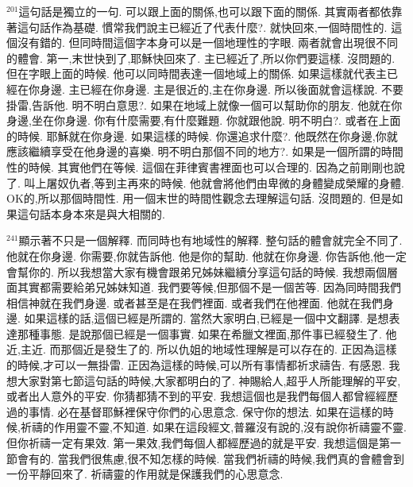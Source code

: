 \documentclass{book}
\begin{document}
$^{201}$這句話是獨立的一句.
可以跟上面的關係,也可以跟下面的關係.
其實兩者都依靠著這句話作為基礎.
慣常我們說主已經近了代表什麼?.
就快回來,一個時間性的.
這個沒有錯的.
但同時間這個字本身可以是一個地理性的字眼.
兩者就會出現很不同的體會.
第一,末世快到了,耶穌快回來了.
主已經近了,所以你們要這樣.
沒問題的.
但在字眼上面的時候.
他可以同時間表達一個地域上的關係.
如果這樣就代表主已經在你身邊.
主已經在你身邊.
主是很近的,主在你身邊.
所以後面就會這樣說.
不要掛雷,告訴他.
明不明白意思?.
如果在地域上就像一個可以幫助你的朋友.
他就在你身邊,坐在你身邊.
你有什麼需要,有什麼難題.
你就跟他說.
明不明白?.
或者在上面的時候.
耶穌就在你身邊.
如果這樣的時候.
你還追求什麼?.
他既然在你身邊,你就應該繼續享受在他身邊的喜樂.
明不明白那個不同的地方?.
如果是一個所謂的時間性的時候.
其實他們在等候.
這個在菲律賓書裡面也可以合理的.
因為之前剛剛也說了.
叫上屠奴仇者,等到主再來的時候.
他就會將他們由卑微的身體變成榮耀的身體.
OK的,所以那個時間性.
用一個末世的時間性觀念去理解這句話.
沒問題的.
但是如果這句話本身本來是與大相關的.

$^{241}$顯示著不只是一個解釋.
而同時也有地域性的解釋.
整句話的體會就完全不同了.
他就在你身邊.
你需要,你就告訴他.
他是你的幫助.
他就在你身邊.
你告訴他,他一定會幫你的.
所以我想當大家有機會跟弟兄姊妹繼續分享這句話的時候.
我想兩個層面其實都需要給弟兄姊妹知道.
我們要等候,但那個不是一個苦等.
因為同時間我們相信神就在我們身邊.
或者甚至是在我們裡面.
或者我們在他裡面.
他就在我們身邊.
如果這樣的話,這個已經是所謂的.
當然大家明白,已經是一個中文翻譯.
是想表達那種事態.
是說那個已經是一個事實.
如果在希臘文裡面,那件事已經發生了.
他近,主近.
而那個近是發生了的.
所以仇姐的地域性理解是可以存在的.
正因為這樣的時候,才可以一無掛雷.
正因為這樣的時候,可以所有事情都祈求禱告.
有感恩.
我想大家對第七節這句話的時候,大家都明白的了.
神賜給人,超乎人所能理解的平安,或者出人意外的平安.
你猜都猜不到的平安.
我想這個也是我們每個人都曾經經歷過的事情.
必在基督耶穌裡保守你們的心思意念.
保守你的想法.
如果在這樣的時候,祈禱的作用靈不靈,不知道.
如果在這段經文,普羅沒有說的,沒有說你祈禱靈不靈.
但你祈禱一定有果效.
第一果效,我們每個人都經歷過的就是平安.
我想這個是第一節會有的.
當我們很焦慮,很不知怎樣的時候.
當我們祈禱的時候,我們真的會體會到一份平靜回來了.
祈禱靈的作用就是保護我們的心思意念.
\end{document}
